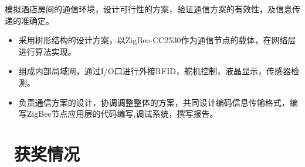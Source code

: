\documentclass{resume}
\begin{document}
	模拟酒店房间的通信环境，设计可行性的方案，验证通信方案的有效性，及信息传递的准确定。
	\begin{onehalfspacing}
		\begin{itemize}[parsep=0.7ex]
			\item 采用树形结构的设计方案，以ZigBee-CC2530作为通信节点的载体，在网络层进行算法实现。
			\item 组成内部局域网，通过I/O口进行外接RFID，舵机控制，液晶显示，传感器检测。
			\item 负责通信方案的设计，协调调整整体的方案，共同设计编码信息传输格式，编写ZigBee节点应用层的代码编写,调试系统，撰写报告。
		\end{itemize}
	\end{onehalfspacing}
	
	\section{\faHeartO\ 获奖情况}
	
\end{document}
